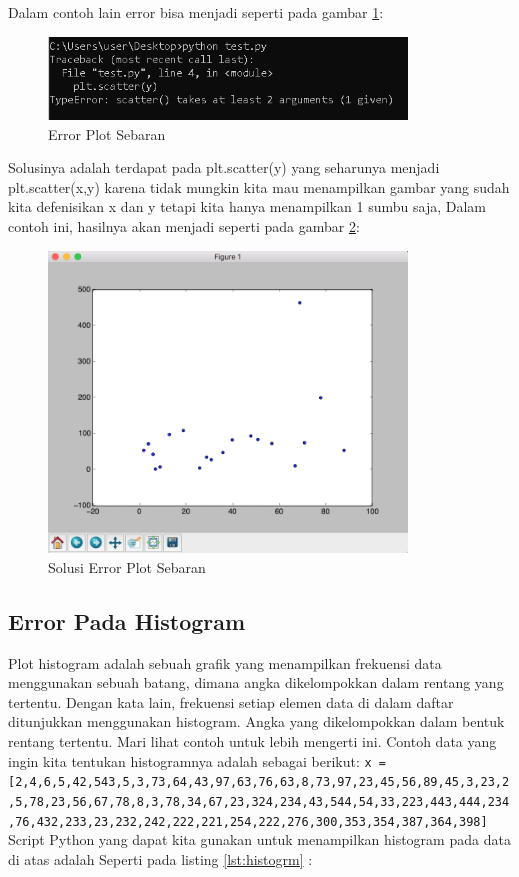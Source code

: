 Dalam contoh lain error bisa menjadi seperti pada gambar \ref{fig:errpltseb}:
\begin{figure}[!htbp]
	\centerline{\includegraphics[width=0.85\textwidth]{figures/6/errpltseb.PNG}}
	\caption{Error Plot Sebaran}
	\label{fig:errpltseb}
\end{figure}       

Solusinya adalah terdapat pada plt.scatter(y) yang seharunya menjadi  plt.scatter(x,y) karena tidak mungkin kita mau menampilkan gambar yang sudah kita defenisikan x dan y tetapi kita hanya menampilkan 1 sumbu saja,
Dalam contoh ini, hasilnya akan menjadi seperti pada gambar \ref{fig:solepsb}:
\begin{figure}[!htbp]
	\centerline{\includegraphics[width=0.85\textwidth]{figures/6/solepsb.PNG}}
	\caption{Solusi Error Plot Sebaran}
	\label{fig:solepsb}
\end{figure}      

\subsection{Error Pada Histogram}
Plot histogram adalah sebuah grafik yang menampilkan frekuensi data menggunakan sebuah batang, dimana angka dikelompokkan dalam rentang yang tertentu. Dengan kata lain, frekuensi setiap elemen data di dalam daftar ditunjukkan menggunakan histogram. Angka yang dikelompokkan dalam bentuk rentang tertentu. Mari lihat contoh untuk lebih mengerti ini.
Contoh data yang ingin kita tentukan histogramnya adalah sebagai berikut:
\verb|x = [2,4,6,5,42,543,5,3,73,64,43,97,63,76,63,8,73,97,23,45,56,89,45,3,23,2,5,78,23,56,67,78,8,3,78,34,67,23,324,234,43,544,54,33,223,443,444,234,76,432,233,23,232,242,222,221,254,222,276,300,353,354,387,364,398]|
Script Python yang dapat kita gunakan untuk menampilkan histogram pada data di atas adalah Seperti pada listing \ref{lst:histogrm} : 



